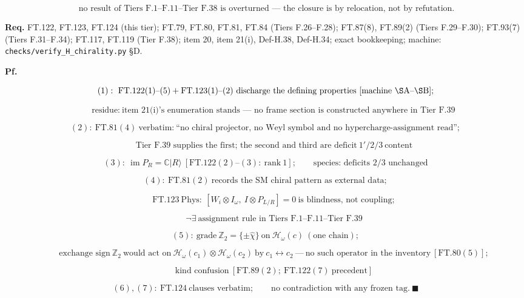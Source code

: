 \documentclass[11pt,openany]{report}
\theoremstyle{canonplain}
\theoremstyle{canondef}
\begin{document}
\[
\ \text{no result of Tiers F.1–F.11–Tier F.38 is overturned — the closure is by relocation, not by refutation}.
\]

\textbf{Req.} FT.122, FT.123, FT.124 (this tier); FT.79, FT.80, FT.81, FT.84 (Tiers F.26–F.28); FT.87(8), FT.89(2) (Tiers F.29–F.30); FT.93(7) (Tiers F.31–F.34); FT.117, FT.119 (Tier F.38); item 20, item 21(i), Def-H.38, Def-H.34; exact bookkeeping; machine: \texttt{checks/\allowbreak{}verify\_\allowbreak{}H\_\allowbreak{}chirality.py} §D.

\textbf{Pf.}

\[
(1):\ \mathrm{FT.122}(1)\text{–}(5)+\mathrm{FT.123}(1)\text{–}(2)\ \text{discharge the defining properties}\ [\text{machine}\ \S\mathrm{A}\text{–}\S\mathrm{B}];
\]

\[
\qquad \text{residue}:\ \text{item 21(i)'s enumeration stands — no frame section is constructed anywhere in Tier F.39}
\]

\[
(2):\ \mathrm{FT.81}(4)\ \text{verbatim:}\ \text{``no chiral projector, no Weyl symbol and no hypercharge-assignment read''};
\]

\[
\qquad \text{Tier F.39 supplies the first; the second and third are deficit}\ 1'/2/3\ \text{content}
\]

\[
(3):\ \operatorname{im}P_R=\mathbb C|R\rangle\ [\mathrm{FT.122}(2)\text{–}(3):\ \text{rank}\ 1];\qquad\text{species: deficits 2/3 unchanged}
\]

\[
(4):\ \mathrm{FT.81}(2)\ \text{records the SM chiral pattern as external data};
\]

\[
\qquad \mathrm{FT.123}\ \text{Phys}:\ [W_i\otimes I_\omega,\ I\otimes P_{L/R}]=0\ \text{is blindness, not coupling};
\]

\[
\qquad \neg\exists\ \text{assignment rule in Tiers F.1–F.11–Tier F.39}
\]

\[
(5):\ \text{grade}\ \mathbb Z_2=\{\pm\hat\chi\}\ \text{on}\ \mathcal H_\omega(c)\ (\text{one chain});
\]

\[
\qquad \text{exchange sign}\ \mathbb Z_2\ \text{would act on}\ \mathcal H_\omega(c_1)\otimes\mathcal H_\omega(c_2)\ \text{by}\ c_1\leftrightarrow c_2\ —\ \text{no such operator in the inventory}\ [\mathrm{FT.80}(5)];
\]

\[
\qquad \text{kind confusion}\ [\mathrm{FT.89}(2);\ \mathrm{FT.122}(7)\ \text{precedent}]
\]

\[
(6),(7):\ \mathrm{FT.124}\ \text{clauses verbatim};\qquad\text{no contradiction with any frozen tag}.\ \blacksquare
\]
\end{document}
